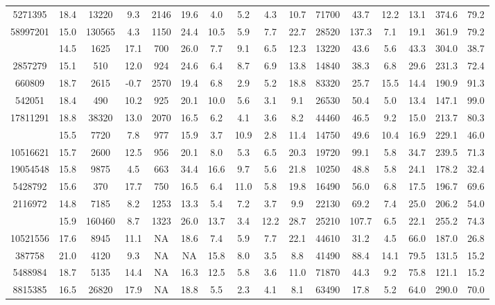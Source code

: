 \documentclass[
]{article}
\begin{document}
\begin{longtable}[t]{cccccccccccccccc}
5271395 & 18.4 & 13220 & 9.3 & 2146 & 19.6 & 4.0 & 5.2 & 4.3 & 10.7 & 71700 & 43.7 & 12.2 & 13.1 & 374.6 & 79.2\\
58997201 & 15.0 & 130565 & 4.3 & 1150 & 24.4 & 10.5 & 5.9 & 7.7 & 22.7 & 28520 & 137.3 & 7.1 & 19.1 & 361.9 & 79.2\\
\addlinespace
1883008 & 14.5 & 1625 & 17.1 & 700 & 26.0 & 7.7 & 9.1 & 6.5 & 12.3 & 13220 & 43.6 & 5.6 & 43.3 & 304.0 & 38.7\\
2857279 & 15.1 & 510 & 12.0 & 924 & 24.6 & 6.4 & 8.7 & 6.9 & 13.8 & 14840 & 38.3 & 6.8 & 29.6 & 231.3 & 72.4\\
660809 & 18.7 & 2615 & -0.7 & 2570 & 19.4 & 6.8 & 2.9 & 5.2 & 18.8 & 83320 & 25.7 & 15.5 & 14.4 & 190.9 & 91.3\\
542051 & 18.4 & 490 & 10.2 & 925 & 20.1 & 10.0 & 5.6 & 3.1 & 9.1 & 26530 & 50.4 & 5.0 & 13.4 & 147.1 & 99.0\\
17811291 & 18.8 & 38320 & 13.0 & 2070 & 16.5 & 6.2 & 4.1 & 3.6 & 8.2 & 44460 & 46.5 & 9.2 & 15.0 & 213.7 & 80.3\\
\addlinespace
36753736 & 15.5 & 7720 & 7.8 & 977 & 15.9 & 3.7 & 10.9 & 2.8 & 11.4 & 14750 & 49.6 & 10.4 & 16.9 & 229.1 & 46.0\\
10516621 & 15.7 & 2600 & 12.5 & 956 & 20.1 & 8.0 & 5.3 & 6.5 & 20.3 & 19720 & 99.1 & 5.8 & 34.7 & 239.5 & 71.3\\
19054548 & 15.8 & 9875 & 4.5 & 663 & 34.4 & 16.6 & 9.7 & 5.6 & 21.8 & 10250 & 48.8 & 5.8 & 24.1 & 178.2 & 32.4\\
5428792 & 15.6 & 370 & 17.7 & 750 & 16.5 & 6.4 & 11.0 & 5.8 & 19.8 & 16490 & 56.0 & 6.8 & 17.5 & 196.7 & 69.6\\
2116972 & 14.8 & 7185 & 8.2 & 1253 & 13.3 & 5.4 & 7.2 & 3.7 & 9.9 & 22130 & 69.2 & 7.4 & 25.0 & 206.2 & 54.0\\
\addlinespace
48085361 & 15.9 & 160460 & 8.7 & 1323 & 26.0 & 13.7 & 3.4 & 12.2 & 28.7 & 25210 & 107.7 & 6.5 & 22.1 & 255.2 & 74.3\\
10521556 & 17.6 & 8945 & 11.1 & NA & 18.6 & 7.4 & 5.9 & 7.7 & 22.1 & 44610 & 31.2 & 4.5 & 66.0 & 187.0 & 26.8\\
387758 & 21.0 & 4120 & 9.3 & NA & NA & 15.8 & 8.0 & 3.5 & 8.8 & 41490 & 88.4 & 14.1 & 79.5 & 131.5 & 15.2\\
5488984 & 18.7 & 5135 & 14.4 & NA & 16.3 & 12.5 & 5.8 & 3.6 & 11.0 & 71870 & 44.3 & 9.2 & 75.8 & 121.1 & 15.2\\
8815385 & 16.5 & 26820 & 17.9 & NA & 18.8 & 5.5 & 2.3 & 4.1 & 8.1 & 63490 & 17.8 & 5.2 & 64.0 & 290.0 & 70.0\\
\bottomrule
\end{longtable}
\end{document}

